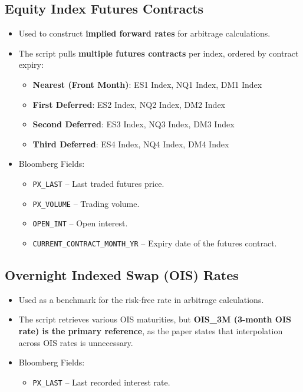 \documentclass{article}
\begin{document}
\subsection{Equity Index Futures Contracts}
\begin{itemize}
  \item Used to construct \textbf{implied forward rates} for arbitrage calculations.
  \item The script pulls \textbf{multiple futures contracts} per index, ordered by contract expiry:
  \begin{itemize}
    \item \textbf{Nearest (Front Month)}: ES1 Index, NQ1 Index, DM1 Index
    \item \textbf{First Deferred}: ES2 Index, NQ2 Index, DM2 Index
    \item \textbf{Second Deferred}: ES3 Index, NQ3 Index, DM3 Index
    \item \textbf{Third Deferred}: ES4 Index, NQ4 Index, DM4 Index
  \end{itemize}
  \item Bloomberg Fields:
  \begin{itemize}
    \item \texttt{PX\_LAST} -- Last traded futures price.
    \item \texttt{PX\_VOLUME} -- Trading volume.
    \item \texttt{OPEN\_INT} -- Open interest.
    \item \texttt{CURRENT\_CONTRACT\_MONTH\_YR} -- Expiry date of the futures contract.
  \end{itemize}
\end{itemize}

\subsection{Overnight Indexed Swap (OIS) Rates}
\begin{itemize}
  \item Used as a benchmark for the risk-free rate in arbitrage calculations.
  \item The script retrieves various OIS maturities, but \textbf{OIS\_3M (3-month OIS rate) is the primary reference}, as the paper states that interpolation across OIS rates is unnecessary.
  \item Bloomberg Fields:
  \begin{itemize}
    \item \texttt{PX\_LAST} -- Last recorded interest rate.
  \end{itemize}
\end{itemize}
\end{document}
